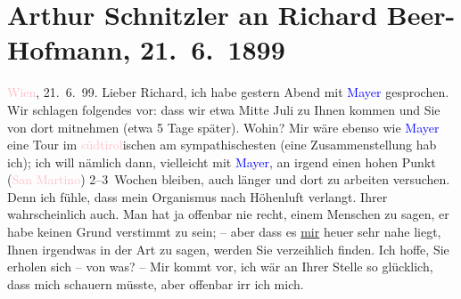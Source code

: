 

               \section[Arthur Schnitzler an Richard Beer-Hofmann, 21. 6. 1899]{ Arthur Schnitzler an Richard Beer-Hofmann, 21. 6. 1899}\nopagebreak{}\rehead{ }\normalsize\beginnumbering{} \toendnotes[C]{\smallbreak\pagebreak[2]} 
\toendnotes[C]{\smallbreak}\pstart
           \raggedleft{}{\pb}\textcolor{pink}{Wien}{}\ledrightnote{\textcolor{pink}{Wien}}, 21. 6. 99.\pend
           \pstart
           Lieber Richard, ich habe gestern Abend mit \textcolor{blue}{Mayer}{}\ledrightnote{\textcolor{blue}{Oskar Mayer}} gesprochen. Wir schlagen folgendes vor: dass wir etwa
                  Mitte Juli zu Ihnen kommen und Sie von dort mitnehmen (etwa 5 Tage
               später). Wohin? Mir wäre ebenso wie \textcolor{blue}{Mayer}{}\ledrightnote{\textcolor{blue}{Oskar Mayer}} eine
               Tour im \textcolor{pink}{südtirol}{}\ledrightnote{\textcolor{pink}{Südtirol}}ischen am sympathischesten (eine
               Zusammenstellung hab ich); ich will nämlich dann, vielleicht mit \textcolor{blue}{Mayer}{}\ledrightnote{\textcolor{blue}{Oskar Mayer}}, an irgend einen hohen Punkt (\textcolor{pink}{San Martino}{}\ledrightnote{\textcolor{pink}{San Martino di Castrozza}}) 2–3 Wochen bleiben, auch länger und dort zu
               arbeiten versuchen. Denn ich fühle, dass mein Organismus nach Höhenluft verlangt.
               Ihrer wahrscheinlich auch. Man hat ja offenbar nie recht, einem Menschen zu sagen, er
               habe keinen Grund verstimmt zu sein; – aber dass es \uline{mir} heuer sehr nahe liegt, Ihnen irgendwas in der Art zu sagen, werden Sie
               verzeihlich finden. Ich hoffe, Sie erholen sich – von was? – Mir kommt vor, ich wär
               an Ihrer Stelle so glücklich, dass mich schauern müsste, aber offenbar irr ich mich.
